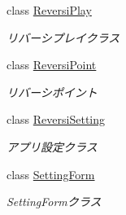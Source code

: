 \begin{DoxyCompactItemize}
class \hyperlink{class_reversi_form_1_1_reversi_play}{Reversi\+Play}
\begin{DoxyCompactList}\small\item\em リバーシプレイクラス \end{DoxyCompactList}\item 
class \hyperlink{class_reversi_form_1_1_reversi_point}{Reversi\+Point}
\begin{DoxyCompactList}\small\item\em リバーシポイント \end{DoxyCompactList}\item 
class \hyperlink{class_reversi_form_1_1_reversi_setting}{Reversi\+Setting}
\begin{DoxyCompactList}\small\item\em アプリ設定クラス \end{DoxyCompactList}\item 
class \hyperlink{class_reversi_form_1_1_setting_form}{Setting\+Form}
\begin{DoxyCompactList}\small\item\em Setting\+Formクラス \end{DoxyCompactList}\end{DoxyCompactItemize}
